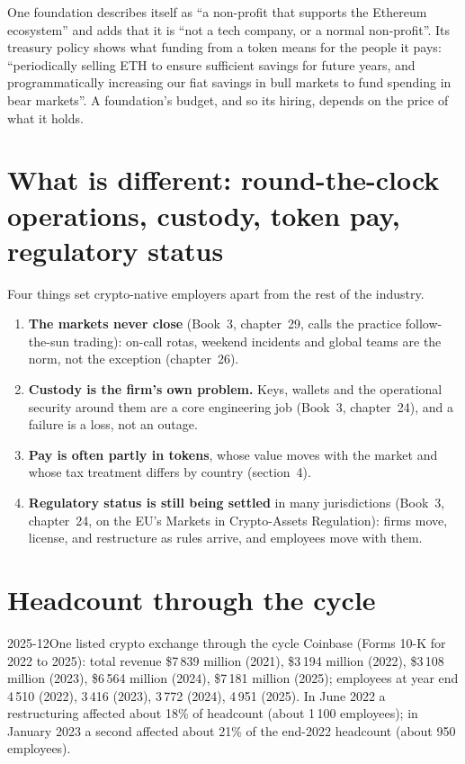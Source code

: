 One foundation describes itself as ``a non-profit that supports the Ethereum ecosystem'' and adds that it is ``not a tech
company, or a normal non-profit''. Its treasury policy shows what funding from a token means for the people it pays:
``periodically selling ETH to ensure sufficient savings for future years, and programmatically increasing our fiat
savings in bull markets to fund spending in bear markets''. A foundation's budget, and so its hiring, depends on the
price of what it holds.

\section{What is different: round-the-clock operations, custody, token pay, regulatory status}

Four things set crypto-native employers apart from the rest of the industry.
\begin{enumerate}
\item \textbf{The markets never close} (Book~3, chapter~29, calls the practice follow-the-sun trading): on-call rotas,
weekend incidents and global teams are the norm, not the exception (chapter~26).
\item \textbf{Custody is the firm's own problem.} Keys, wallets and the operational security around them are a core
engineering job (Book~3, chapter~24), and a failure is a loss, not an outage.
\item \textbf{Pay is often partly in tokens}, whose value moves with the market and whose tax treatment differs by
country (section~4).
\item \textbf{Regulatory status is still being settled} in many jurisdictions (Book~3, chapter~24, on the EU's
Markets in Crypto-Assets Regulation): firms move, license, and restructure as rules arrive, and employees move with them.
\end{enumerate}

\section{Headcount through the cycle}

\begin{dated}{2025-12}{One listed crypto exchange through the cycle}\label{dat:in:crypto-native-firms:coinbase}
Coinbase (Forms 10-K for 2022 to 2025): total revenue \$7\,839 million (2021), \$3\,194 million (2022), \$3\,108 million
(2023), \$6\,564 million (2024), \$7\,181 million (2025); employees at year end 4\,510 (2022), 3\,416 (2023), 3\,772 (2024),
4\,951 (2025). In June 2022 a restructuring affected about 18\% of headcount (about 1\,100 employees); in January 2023 a
second affected about 21\% of the end-2022 headcount (about 950 employees).
\end{dated}

